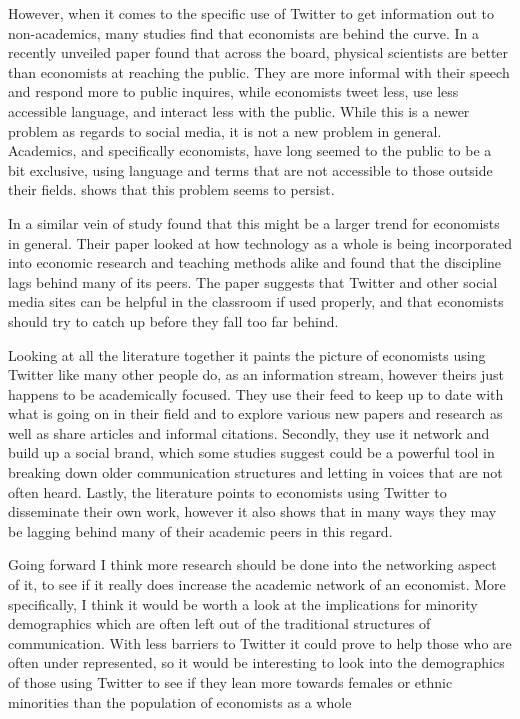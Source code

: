 \documentclass[12pt, Times New Roman]{article}
\begin{document}
However, when it comes to the specific use of Twitter to get information out to non-academics, many studies find that economists are behind the curve. In a recently unveiled paper \citet{Giusta} found that across the board, physical scientists are better than economists at reaching the public. They are more informal with their speech and respond more to public inquires, while economists tweet less, use less accessible language, and interact less with the public. While this is a newer problem as regards to social media, it is not a new problem in general. Academics, and specifically economists, have long seemed to the public to be a bit exclusive, using language and terms that are not accessible to those outside their fields. \citet{Giusta} shows that this problem seems to persist. 

In a similar vein of study \citet{Bahrani} found that this might be a larger trend for economists in general. Their paper looked at how technology as a whole is being incorporated into economic research and teaching methods alike and found that the discipline lags behind many of its peers. The paper suggests that Twitter and other social media sites can be helpful in the classroom if used properly, and that economists should try to catch up before they fall too far behind. 

Looking at all the literature together it paints the picture of economists using Twitter like many other people do, as an information stream, however theirs just happens to be academically focused. They use their feed to keep up to date with what is going on in their field and to explore various new papers and research as well as share articles and informal citations. Secondly, they use it network and build up a social brand, which some studies suggest could be a powerful tool in breaking down older communication structures and letting in voices that are not often heard. Lastly, the literature points to economists using Twitter to disseminate their own work, however it also shows that in many ways they may be lagging behind many of their academic peers in this regard. 

Going forward I think more research should be done into the networking aspect of it, to see if it really does increase the academic network of an economist. More specifically, I think it would be worth a look at the implications for minority demographics which are often left out of the traditional structures of communication. With less barriers to Twitter it could prove to help those who are often under represented, so it would be interesting to look into the demographics of those using Twitter to see if they lean more towards females or ethnic minorities than the population of economists as a whole
\end{document}
